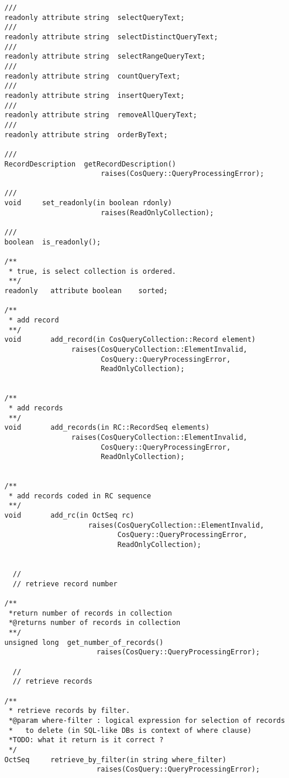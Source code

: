 \documentclass[10pt]{article}
\begin{document}
\begin{verbatim}
   ///
   readonly attribute string  selectQueryText;
   ///
   readonly attribute string  selectDistinctQueryText;
   ///
   readonly attribute string  selectRangeQueryText;
   ///
   readonly attribute string  countQueryText;
   ///
   readonly attribute string  insertQueryText;
   ///
   readonly attribute string  removeAllQueryText;
   ///
   readonly attribute string  orderByText;

   ///
   RecordDescription  getRecordDescription()
                          raises(CosQuery::QueryProcessingError);

   ///
   void     set_readonly(in boolean rdonly)
                          raises(ReadOnlyCollection);

   ///
   boolean  is_readonly();

   /**
    * true, is select collection is ordered.
    **/
   readonly   attribute boolean    sorted;

   /**
    * add record
    **/
   void       add_record(in CosQueryCollection::Record element) 
                   raises(CosQueryCollection::ElementInvalid,
                          CosQuery::QueryProcessingError,
                          ReadOnlyCollection);


   /**
    * add records
    **/
   void       add_records(in RC::RecordSeq elements) 
                   raises(CosQueryCollection::ElementInvalid,
                          CosQuery::QueryProcessingError,
                          ReadOnlyCollection);


   /**
    * add records coded in RC sequence
    **/
   void       add_rc(in OctSeq rc)
                       raises(CosQueryCollection::ElementInvalid,
                              CosQuery::QueryProcessingError,
                              ReadOnlyCollection);


     //
     // retrieve record number

   /**
    *return number of records in collection
    *@returns number of records in collection
    **/
   unsigned long  get_number_of_records()
                         raises(CosQuery::QueryProcessingError);

     //
     // retrieve records

   /**
    * retrieve records by filter. 
    *@param where-filter : logical expression for selection of records 
    *   to delete (in SQL-like DBs is context of where clause)
    *TODO: what it return is it correct ?
    */
   OctSeq     retrieve_by_filter(in string where_filter)
                         raises(CosQuery::QueryProcessingError);


\end{verbatim}
\end{document}
